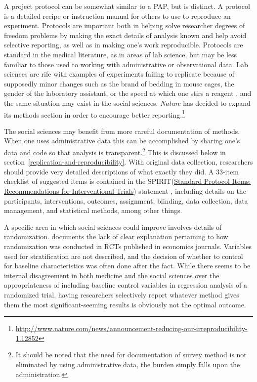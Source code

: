 \documentclass[12pt] {article}
\begin{document}
A project protocol can be somewhat similar to a PAP, but is distinct. A protocol is a detailed recipe or instruction manual for others to use to reproduce an experiment. Protocols are important both in helping solve researcher degrees of freedom problems by making the exact details of analysis known and help avoid selective reporting, as well as in making one's work reproducible. Protocols are standard in the medical literature, as in areas of lab science, but may be less familiar to those used to working with administrative or observational data. Lab sciences are rife with examples of experiments failing to replicate because of supposedly minor changes such as the brand of bedding in mouse cages, the gender of the laboratory assistant, or the speed at which one stirs a reagent \citep{sorge2014olfactory, hines2014sorting}, and the same situation may exist in the social sciences. \textit{Nature} has decided to expand its methods section in order to encourage better reporting.\footnote{\url{http://www.nature.com/news/announcement-reducing-our-irreproducibility-1.12852}}

The social sciences may benefit from more careful documentation of methods. When one uses administrative data this can be accomplished by sharing one's data and code so that analysis is transparent.\footnote{It should be noted that the need for documentation of survey method is not eliminated by using administrative data, the burden simply falls upon the administration.} This is discussed below in section~\ref{replication-and-reproducibility}. With original data collection, researchers should provide very detailed descriptions of what exactly they did. A 33-item checklist of suggested items is contained in the SPIRIT(\href{http://www.spirit-statement.org}{Standard Protocol Items: Recommendations for Interventional
Trials}) statement \citep{chan_spirit_2013}, including details on the participants, interventions, outcomes, assignment, blinding, data collection, data management, and statistical methods, among other things. 

A specific area in which social sciences could improve involves details of randomization. \cite{bruhn_pursuit_2009} documents the lack of clear explanation pertaining to how randomization was conducted in RCTs published in economics journals. Variables used for stratification are not described, and the decision of whether to control for baseline characteristics was often done after the fact. While there seems to be internal disagreement in both
medicine and the social sciences over the appropriateness of including baseline
control variables in regression analysis of a randomized trial, having
researchers selectively report whatever method gives them the most
significant-seeming results is obviously not the optimal outcome. 
\end{document}
